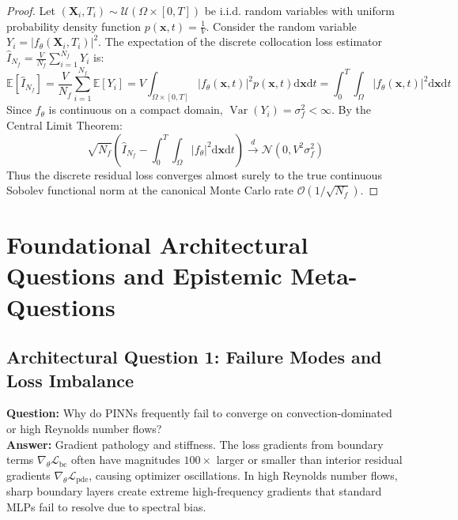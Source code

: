 \documentclass[11pt,a4paper]{article}
\theoremstyle{definition}
\begin{document}
\begin{proof}
Let $(\mathbf{X}_i, T_i) \sim \mathcal{U}(\Omega \times [0, T])$ be i.i.d. random variables with uniform probability density function $p(\mathbf{x}, t) = \frac{1}{V}$.
Consider the random variable $Y_i = |f_\theta(\mathbf{X}_i, T_i)|^2$.
The expectation of the discrete collocation loss estimator $\hat{I}_{N_f} = \frac{V}{N_f} \sum_{i=1}^{N_f} Y_i$ is:
{\boldmath
\begin{equation}
\mathbb{E}[\hat{I}_{N_f}] = \frac{V}{N_f} \sum_{i=1}^{N_f} \mathbb{E}[Y_i] = V \int_{\Omega \times [0, T]} |f_\theta(\mathbf{x}, t)|^2 p(\mathbf{x}, t) \mathrm{d}\mathbf{x} \mathrm{d}t = \int_0^T \int_\Omega |f_\theta(\mathbf{x}, t)|^2 \mathrm{d}\mathbf{x} \mathrm{d}t
\end{equation}
}
Since $f_\theta$ is continuous on a compact domain, $\operatorname{Var}(Y_i) = \sigma_f^2 < \infty$.
By the Central Limit Theorem:
{\boldmath
\begin{equation}
\sqrt{N_f}\left( \hat{I}_{N_f} - \int_0^T \int_\Omega |f_\theta|^2 \mathrm{d}\mathbf{x} \mathrm{d}t \right) \xrightarrow{d} \mathcal{N}(0, V^2 \sigma_f^2)
\end{equation}
}
Thus the discrete residual loss converges almost surely to the true continuous Sobolev functional norm at the canonical Monte Carlo rate $\mathcal{O}(1/\sqrt{N_f})$.
\end{proof}

\section{Foundational Architectural Questions and Epistemic Meta-Questions}

\subsection{Architectural Question 1: Failure Modes and Loss Imbalance}
\textbf{Question:} Why do PINNs frequently fail to converge on convection-dominated or high Reynolds number flows?\\
\textbf{Answer:} Gradient pathology and stiffness. The loss gradients from boundary terms $\nabla_\theta \mathcal{L}_{\text{bc}}$ often have magnitudes $100\times$ larger or smaller than interior residual gradients $\nabla_\theta \mathcal{L}_{\text{pde}}$, causing optimizer oscillations. In high Reynolds number flows, sharp boundary layers create extreme high-frequency gradients that standard MLPs fail to resolve due to spectral bias.
\end{document}
